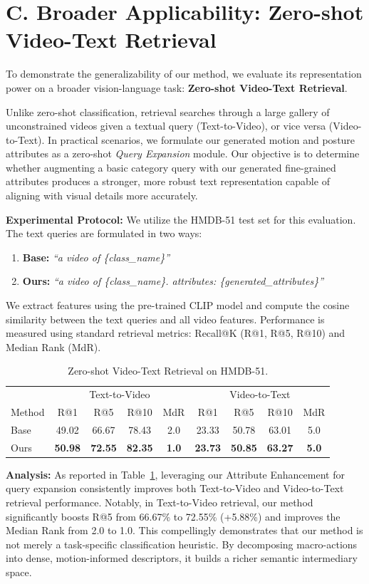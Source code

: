 \documentclass[runningheads]{llncs}
\begin{document}
\section{C. Broader Applicability: Zero-shot Video-Text Retrieval}
\label{sec:retrieval_applicability}

To demonstrate the generalizability of our method, we evaluate its representation power on a broader vision-language task: \textbf{Zero-shot Video-Text Retrieval}.

Unlike zero-shot classification, retrieval searches through a large gallery of unconstrained videos given a textual query (Text-to-Video), or vice versa (Video-to-Text). In practical scenarios, we formulate our generated motion and posture attributes as a zero-shot \textit{Query Expansion} module. Our objective is to determine whether augmenting a basic category query with our generated fine-grained attributes produces a stronger, more robust text representation capable of aligning with visual details more accurately.

\textbf{Experimental Protocol:}
We utilize the HMDB-51 test set for this evaluation.
The text queries are formulated in two ways:
\begin{enumerate}
    \item \textbf{Base:} \textit{``a video of \{class\_name\}''}
    \item \textbf{Ours:} \textit{``a video of \{class\_name\}. attributes: \{generated\_attributes\}''}
\end{enumerate}
We extract features using the pre-trained CLIP model and compute the cosine similarity
between the text queries and all video features.
Performance is measured using standard retrieval metrics:
Recall@K (R@1, R@5, R@10) and Median Rank (MdR).




\begin{table}[h]
\centering
\caption{Zero-shot Video-Text Retrieval on HMDB-51.}
\label{tab:retrieval_results}
\begin{tabular}{lcccccccc}
\hline
 & \multicolumn{4}{c}{Text-to-Video} & \multicolumn{4}{c}{Video-to-Text} \\
Method & R@1 & R@5 & R@10 & MdR & R@1 & R@5 & R@10 & MdR \\
\hline
Base  & 49.02 & 66.67 & 78.43 & 2.0 & 23.33 & 50.78 & 63.01 & 5.0 \\
Ours  & \textbf{50.98} & \textbf{72.55} & \textbf{82.35} & \textbf{1.0} & \textbf{23.73} & \textbf{50.85} & \textbf{63.27} & \textbf{5.0} \\
\hline
\end{tabular}
\end{table}


\textbf{Analysis:} As reported in Table~\ref{tab:retrieval_results}, leveraging our Attribute Enhancement for query expansion consistently improves both Text-to-Video and Video-to-Text retrieval performance. Notably, in Text-to-Video retrieval, our method significantly boosts R@5 from 66.67\% to 72.55\% (+5.88\%) and improves the Median Rank from 2.0 to 1.0. This compellingly demonstrates that our method is not merely a task-specific classification heuristic. By decomposing macro-actions into dense, motion-informed descriptors, it builds a richer semantic intermediary space.
\clearpage
\end{document}
